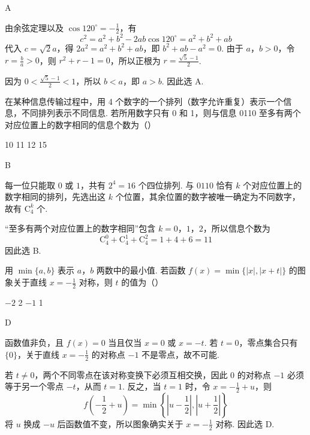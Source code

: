 \begin{answer}
A
\end{answer}

\begin{solution}
由余弦定理以及 \(\cos120^{\circ}=-\frac12\)，有
\[
c^2=a^2+b^2-2ab\cos120^{\circ}=a^2+b^2+ab
\]
代入 \(c=\sqrt2a\)，得 \(2a^2=a^2+b^2+ab\)，即
\(b^2+ab-a^2=0\). 由于 \(a\)，\(b>0\)，令 \(r=\frac ba>0\)，则
\(r^2+r-1=0\)，所以正根为 \(r=\frac{\sqrt5-1}{2}\).

因为 \(0<\frac{\sqrt5-1}{2}<1\)，所以 \(b<a\)，即 \(a>b\). 因此选 A.
\end{solution}

\begin{problem}
在某种信息传输过程中，用 4 个数字的一个排列（数字允许重复）表示一个信息，不同排列表示不同信息. 若所用数字只有 0 和 1，则与信息 0110 至多有两个对应位置上的数字相同的信息个数为（\quad）

\choices
    {10}
    {11}
    {12}
    {15}
\end{problem}

\begin{answer}
B
\end{answer}

\begin{solution}
每一位只能取 \(0\) 或 \(1\)，共有 \(2^4=16\) 个四位排列. 与 \(0110\) 恰有 \(k\) 个对应位置上的数字相同的排列，先选出这 \(k\) 个位置，其余位置的数字被唯一确定为不同数字，故有 \(\mathrm C_4^k\) 个.

“至多有两个对应位置上的数字相同”包含 \(k=0\)，\(1\)，\(2\)，所以信息个数为
\[
\mathrm C_4^0+\mathrm C_4^1+\mathrm C_4^2=1+4+6=11
\]
因此选 B.
\end{solution}

\begin{problem}
用 \(\min \{a, b\}\) 表示 \(a\)，\(b\) 两数中的最小值. 若函数 \(f(x) = \min \{|x|, |x + t|\}\) 的图象关于直线 \(x = -\frac{1}{2}\) 对称，则 \(t\) 的值为（\quad）

\choices
    {\(-2\)}
    {2}
    {\(-1\)}
    {1}
\end{problem}

\begin{answer}
D
\end{answer}

\begin{solution}
函数值非负，且 \(f(x)=0\) 当且仅当 \(x=0\) 或 \(x=-t\). 若 \(t=0\)，零点集合只有 \(\{0\}\)，关于直线 \(x=-\frac12\) 的对称点 \(-1\) 不是零点，故不可能.

若 \(t\ne0\)，两个不同零点在该对称变换下必须互相交换，因此 \(0\) 的对称点 \(-1\) 必须等于另一个零点 \(-t\)，从而 \(t=1\). 反之，当 \(t=1\) 时，令 \(x=-\frac12+u\)，则
\[
f\left(-\frac12+u\right)=\min\left\{\left|u-\frac12\right|,\left|u+\frac12\right|\right\}
\]
将 \(u\) 换成 \(-u\) 后函数值不变，所以图象确实关于 \(x=-\frac12\) 对称. 因此选 D.
\end{solution}

